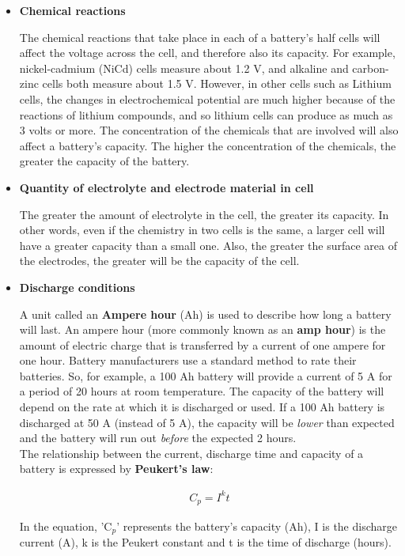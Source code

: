 \begin{itemize}
\item{\textbf{Chemical reactions}

The chemical reactions that take place in each of a battery's half cells will affect the voltage across the cell, and therefore also its capacity. For example, nickel-cadmium (NiCd) cells measure about 1.2 V, and alkaline and carbon-zinc cells both measure about 1.5 V. However, in other cells such as Lithium cells, the changes in electrochemical potential are much higher because of the reactions of lithium compounds, and so lithium cells can produce as much as 3 volts or more. The concentration of the chemicals that are involved will also affect a battery's capacity. The higher the concentration of the chemicals, the greater the capacity of the battery.
}

\item{\textbf{Quantity of electrolyte and electrode material in cell}

The greater the amount of electrolyte in the cell, the greater its capacity. In other words, even if the chemistry in two cells is the same, a larger cell will have a greater capacity than a small one. Also, the greater the surface area of the electrodes, the greater will be the capacity of the cell.
}

\item{\textbf{Discharge conditions}

A unit called an \textbf{Ampere hour} (Ah) is used to describe how long a battery will last. An ampere hour (more commonly known as an \textbf{amp hour}) is the amount of electric charge that is transferred by a current of one ampere for one hour. Battery manufacturers use a standard method to rate their batteries. So, for example, a 100 Ah battery will provide a current of 5 A for a period of 20 hours at room temperature. The capacity of the battery will depend on the rate at which it is discharged or used. If a 100 Ah battery is discharged at 50 A (instead of 5 A), the capacity will be \textit{lower} than expected and the battery will run out \textit{before} the expected 2 hours.\\

The relationship between the current, discharge time and capacity of a battery is expressed by \textbf{Peukert's law}:

\begin{eqnarray*}
C_{p} = I^{k}t
\end{eqnarray*}

In the equation, 'C$_{p}$' represents the battery's capacity (Ah), I is the discharge current (A), k is the Peukert constant and t is the time of discharge (hours).
}
\end{itemize}

